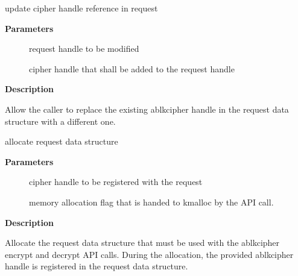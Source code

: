 \documentclass[a4paper,8pt,english]{sphinxmanual}
\begin{document}
\begin{fulllineitems}
\label{crypto/api-skcipher:c.ablkcipher_request_set_tfm}
update cipher handle reference in request

\end{fulllineitems}


\textbf{Parameters}
\begin{description}
\item[{}] \leavevmode
request handle to be modified

\item[{}] \leavevmode
cipher handle that shall be added to the request handle

\end{description}

\textbf{Description}

Allow the caller to replace the existing ablkcipher handle in the request
data structure with a different one.

\begin{fulllineitems}
\label{crypto/api-skcipher:c.ablkcipher_request_alloc}
allocate request data structure

\end{fulllineitems}


\textbf{Parameters}
\begin{description}
\item[{}] \leavevmode
cipher handle to be registered with the request

\item[{}] \leavevmode
memory allocation flag that is handed to kmalloc by the API call.

\end{description}

\textbf{Description}

Allocate the request data structure that must be used with the ablkcipher
encrypt and decrypt API calls. During the allocation, the provided ablkcipher
handle is registered in the request data structure.
\end{document}
